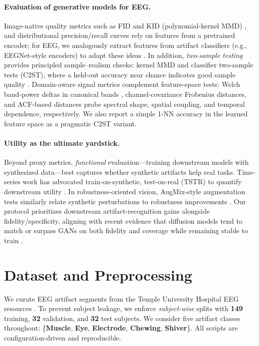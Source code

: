 \documentclass{article}
\begin{document}
\paragraph{Evaluation of generative models for EEG.}
Image-native quality metrics such as FID \citep{heusel2017ganstrained} and KID (polynomial-kernel MMD) \citep{binkowski2018demystifyingmmd}, and distributional precision/recall curves \citep{sajjadi2018assessingprecision,kynkaanniemi2019improvedprecision} rely on features from a pretrained encoder; for EEG, we analogously extract features from artifact classifiers (e.g., EEGNet-style encoders) to adapt these ideas \citep{lawhern2018eegnetcompact}. In addition, \emph{two-sample testing} provides principled sample–realism checks: kernel MMD \citep{gretton2012kerneltwo} and classifier two-sample tests (C2ST), where a held-out accuracy near chance indicates good sample quality \citep{lopezpaz2017revisitingclassifier}. Domain-aware signal metrics complement feature-space tests: Welch band-power deltas in canonical bands \citep{welch1967usefast}, channel-covariance Frobenius distances, and ACF-based distances probe spectral shape, spatial coupling, and temporal dependence, respectively. We also report a simple 1-NN accuracy in the learned feature space as a pragmatic C2ST variant. 

\paragraph{Utility as the ultimate yardstick.}
Beyond proxy metrics, \emph{functional} evaluation—training downstream models with synthesized data—best captures whether synthetic artifacts help real tasks. Time-series work has advocated train-on-synthetic, test-on-real (TSTR) to quantify downstream utility \citep{yoon2019timegan}. In robustness-oriented vision, AugMix-style augmentation tests similarly relate synthetic perturbations to robustness improvements \citep{hendrycks2020augmixsimple}. Our protocol prioritizes downstream artifact-recognition gains alongside fidelity/specificity, aligning with recent evidence that diffusion models tend to match or surpass GANs on both fidelity and coverage while remaining stable to train \citep{dhariwal2021beatgans,nichol2021improveddenoising}.



\section{Dataset and Preprocessing}
\label{sec:data}
We curate EEG artifact segments from the Temple University Hospital EEG resources \citep{obeid2016tuh}. To prevent subject leakage, we enforce \emph{subject-wise} splits with \textbf{149} training, \textbf{32} validation, and \textbf{32} test subjects. We consider five artifact classes throughout: \{\textbf{Muscle}, \textbf{Eye}, \textbf{Electrode}, \textbf{Chewing}, \textbf{Shiver}\}. All scripts are configuration-driven and reproducible.
\end{document}
